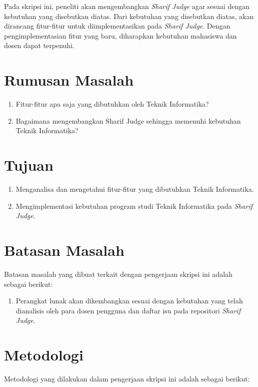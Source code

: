 Pada skripsi ini, peneliti akan mengembangkan \textit{Sharif Judge} agar sesuai dengan kebutuhan yang disebutkan diatas. Dari kebutuhan yang disebutkan diatas, akan dirancang fitur-fitur untuk diimplementasikan pada \textit{Sharif Judge}. Dengan pengimplementasian fitur yang baru, diharapkan kebutuhan mahasiswa dan dosen dapat terpenuhi.

\section{Rumusan Masalah}
\label{sec:rumusan}
\begin{enumerate}
	\item Fitur-fitur apa saja yang dibutuhkan oleh Teknik Informatika?
	\item Bagaimana mengembangkan Sharif Judge sehingga memenuhi kebutuhan Teknik Informatika?
\end{enumerate}

\section{Tujuan}
\label{sec:tujuan}
\begin{enumerate}
	\item Menganalisa dan mengetahui fitur-fitur yang dibutuhkan Teknik Informatika.
	\item Mengimplementasi kebutuhan program studi Teknik Informatika pada \textit{Sharif Judge}.
\end{enumerate}

\section{Batasan Masalah}
\label{sec:batasan}
Batasan masalah yang dibuat terkait dengan pengerjaan skripsi ini adalah sebagai berikut:
\begin{enumerate}
	\item Perangkat lunak akan dikembangkan sesuai dengan kebutuhan yang telah dianalisis oleh para dosen pengguna dan daftar isu pada repositori \textit{Sharif Judge}.
\end{enumerate}

\section{Metodologi}
\label{sec:metlit}Metodologi yang dilakukan dalam pengerjaan skripsi ini adalah sebagai berikut:

